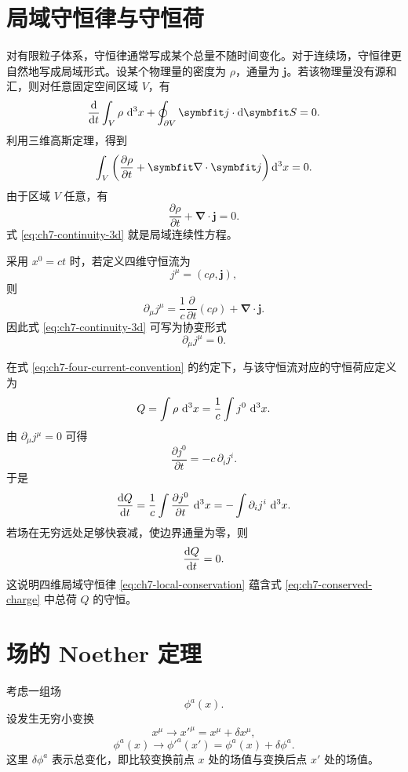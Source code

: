 \section{局域守恒律与守恒荷}

对有限粒子体系，守恒律通常写成某个总量不随时间变化。对于连续场，守恒律更自然地写成局域形式。设某个物理量的密度为 $\rho$，通量为 $\bm{j}$。若该物理量没有源和汇，则对任意固定空间区域 $V$，有
\[
\frac{\dif}{\dif t}\int_{V}\rho\,\dif^{3}x
+
\oint_{\partial V}\bm{j}\cdot\dif\bm{S}=0.
\]
利用三维高斯定理，得到
\[
\int_{V}\left(
\frac{\partial\rho}{\partial t}
+\bm{\nabla}\cdot\bm{j}
\right)\dif^{3}x=0.
\]
由于区域 $V$ 任意，有
\begin{equation}
	\frac{\partial\rho}{\partial t}
	+\bm{\nabla}\cdot\bm{j}=0.
	\label{eq:ch7-continuity-3d}
\end{equation}
式 \eqref{eq:ch7-continuity-3d} 就是局域连续性方程。

采用 $x^{0}=ct$ 时，若定义四维守恒流为
\begin{equation}
	j^{\mu}=(c\rho,\bm{j}),
	\label{eq:ch7-four-current-convention}
\end{equation}
则
\[
\partial_{\mu}j^{\mu}
=
\frac{1}{c}\frac{\partial}{\partial t}(c\rho)
+\bm{\nabla}\cdot\bm{j}.
\]
因此式 \eqref{eq:ch7-continuity-3d} 可写为协变形式
\begin{equation}
	\partial_{\mu}j^{\mu}=0.
	\label{eq:ch7-local-conservation}
\end{equation}

在式 \eqref{eq:ch7-four-current-convention} 的约定下，与该守恒流对应的守恒荷应定义为
\begin{equation}
	Q=\int \rho\,\mathop{}\!\mathrm{d}^{3}x
	=\frac{1}{c}\int j^{0}\,\mathop{}\!\mathrm{d}^{3}x.
	\label{eq:ch7-conserved-charge}
\end{equation}
由 $\partial_{\mu}j^{\mu}=0$ 可得
\[
\frac{\partial j^{0}}{\partial t}=-c\,\partial_{i}j^{i}.
\]
于是
\[
\frac{\mathop{}\!\mathrm{d} Q}{\mathop{}\!\mathrm{d} t}
=
\frac{1}{c}\int \frac{\partial j^{0}}{\partial t}\,\mathop{}\!\mathrm{d}^{3}x
=
-\int \partial_{i}j^{i}\,\mathop{}\!\mathrm{d}^{3}x.
\]
若场在无穷远处足够快衰减，使边界通量为零，则
\[
\frac{\mathop{}\!\mathrm{d} Q}{\mathop{}\!\mathrm{d} t}=0.
\]
这说明四维局域守恒律 \eqref{eq:ch7-local-conservation} 蕴含式 \eqref{eq:ch7-conserved-charge} 中总荷 $Q$ 的守恒。

\section{场的 Noether 定理}

考虑一组场
\[
\phi^{a}(x).
\]
设发生无穷小变换
\[
x^{\mu}\rightarrow x'^{\mu}=x^{\mu}+\delta x^{\mu},
\]
\[
\phi^{a}(x)\rightarrow \phi'^{a}(x')=\phi^{a}(x)+\delta\phi^{a}.
\]
这里 $\delta\phi^{a}$ 表示总变化，即比较变换前点 $x$ 处的场值与变换后点 $x'$ 处的场值。

